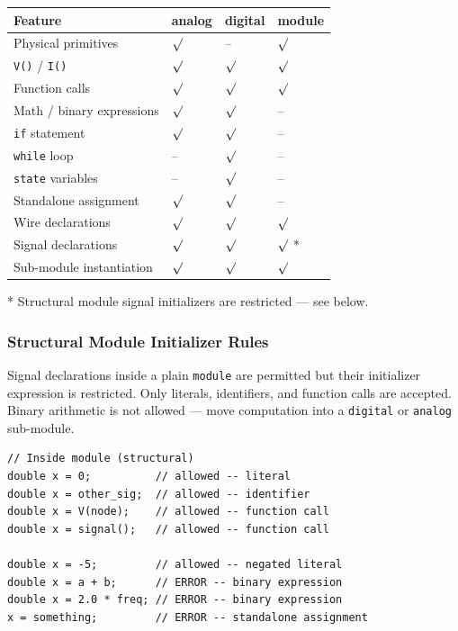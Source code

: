 \documentclass[11pt, a4paper]{article}
\newcommand{\code}[1]{\texttt{\small #1}}
\begin{document}
\begin{center}
\renewcommand{\arraystretch}{1.5}
\begin{tabular}{@{} L{4.5cm} C{2.2cm} C{2.2cm} C{2.2cm} @{}}
\toprule
\textbf{Feature} & \textbf{analog} & \textbf{digital} & \textbf{module} \\
\midrule
Physical primitives          & $\surd$   & --         & $\surd$   \\
\code{V()} / \code{I()}      & $\surd$   & $\surd$   & $\surd$   \\
Function calls               & $\surd$   & $\surd$   & $\surd$   \\
Math / binary expressions    & $\surd$   & $\surd$   & -- \\
\code{if} statement          & $\surd$   & $\surd$   & -- \\
\code{while} loop            & --         & $\surd$   & -- \\
\code{state} variables       & --         & $\surd$   & -- \\
Standalone assignment        & $\surd$   & $\surd$   & -- \\
Wire declarations            & $\surd$   & $\surd$   & $\surd$   \\
Signal declarations          & $\surd$   & $\surd$   & $\surd$  * \\
Sub-module instantiation     & $\surd$   & $\surd$   & $\surd$   \\
\bottomrule
\end{tabular}
\end{center}

\noindent\small{* Structural module signal initializers are restricted — see below.}

\normalsize

\subsubsection*{Structural Module Initializer Rules}

Signal declarations inside a plain \code{module} are permitted but their
initializer expression is restricted. Only literals, identifiers, and function
calls are accepted. Binary arithmetic is not allowed — move computation into
a \code{digital} or \code{analog} sub-module.

\begin{lstlisting}
// Inside module (structural)
double x = 0;          // allowed -- literal
double x = other_sig;  // allowed -- identifier
double x = V(node);    // allowed -- function call
double x = signal();   // allowed -- function call

double x = -5;         // allowed -- negated literal
double x = a + b;      // ERROR -- binary expression
double x = 2.0 * freq; // ERROR -- binary expression
x = something;         // ERROR -- standalone assignment
\end{lstlisting}
\end{document}
